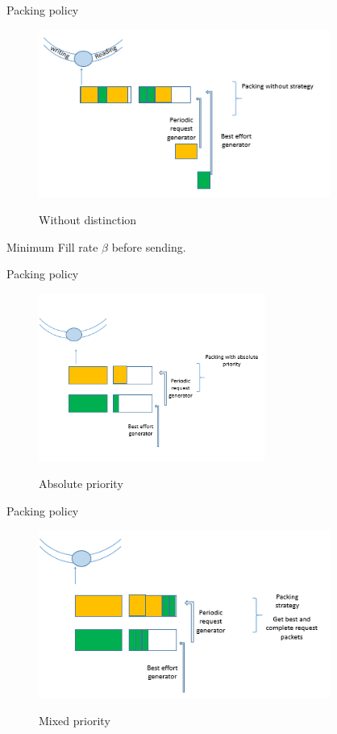 \documentclass[10 pt]{beamer}
\begin{document}
\begin{frame}{Packing policy}
\begin{figure}[h!]

\includegraphics[height=5.5cm]{etape1.png}
\label{fig:1}
\caption{Without distinction}
\end{figure}

Minimum Fill rate $\beta$ before sending.
\end{frame}

\begin{frame}{Packing policy}
\begin{figure}[h!]

\includegraphics[height=5.5cm]{mod1.png}
\label{fig:1}
\caption{Absolute priority}
\end{figure}


\end{frame}

\begin{frame}{Packing policy}
\begin{figure}[h!]

\includegraphics[height=5.5cm]{mod3.png}
\label{fig:1}
\caption{Mixed priority}
\end{figure}
\end{frame}
\end{document}
